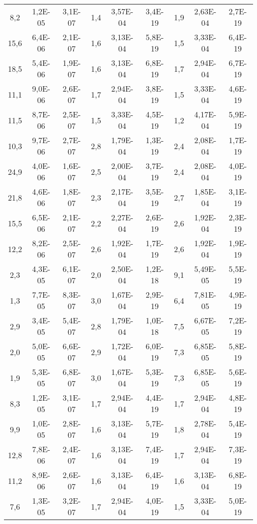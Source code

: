 \begin{longtable}{c c c c c c c c c}
8,2 & 1,2E-05 & 3,1E-07 & 1,4 & 3,57E-04 & 3,4E-19 & 1,9 & 2,63E-04 & 2,7E-19 \\ 
15,6 & 6,4E-06 & 2,1E-07 & 1,6 & 3,13E-04 & 5,8E-19 & 1,5 & 3,33E-04 & 6,4E-19 \\ 
18,5 & 5,4E-06 & 1,9E-07 & 1,6 & 3,13E-04 & 6,8E-19 & 1,7 & 2,94E-04 & 6,7E-19 \\ 
11,1 & 9,0E-06 & 2,6E-07 & 1,7 & 2,94E-04 & 3,8E-19 & 1,5 & 3,33E-04 & 4,6E-19 \\ 
11,5 & 8,7E-06 & 2,5E-07 & 1,5 & 3,33E-04 & 4,5E-19 & 1,2 & 4,17E-04 & 5,9E-19 \\ \midrule

10,3 & 9,7E-06 & 2,7E-07 & 2,8 & 1,79E-04 & 1,3E-19 & 2,4 & 2,08E-04 & 1,7E-19 \\ 
24,9 & 4,0E-06 & 1,6E-07 & 2,5 & 2,00E-04 & 3,7E-19 & 2,4 & 2,08E-04 & 4,0E-19 \\ 
21,8 & 4,6E-06 & 1,8E-07 & 2,3 & 2,17E-04 & 3,5E-19 & 2,7 & 1,85E-04 & 3,1E-19 \\ 
15,5 & 6,5E-06 & 2,1E-07 & 2,2 & 2,27E-04 & 2,6E-19 & 2,6 & 1,92E-04 & 2,3E-19 \\ 
12,2 & 8,2E-06 & 2,5E-07 & 2,6 & 1,92E-04 & 1,7E-19 & 2,6 & 1,92E-04 & 1,9E-19 \\  \hline

2,3 & 4,3E-05 & 6,1E-07 & 2,0 & 2,50E-04 & 1,2E-18 & 9,1 & 5,49E-05 & 5,5E-19 \\ 
1,3 & 7,7E-05 & 8,3E-07 & 3,0 & 1,67E-04 & 2,9E-19 & 6,4 & 7,81E-05 & 4,9E-19 \\ 
2,9 & 3,4E-05 & 5,4E-07 & 2,8 & 1,79E-04 & 1,0E-18 & 7,5 & 6,67E-05 & 7,2E-19 \\ 
2,0 & 5,0E-05 & 6,6E-07 & 2,9 & 1,72E-04 & 6,0E-19 & 7,3 & 6,85E-05 & 5,8E-19 \\ 
1,9 & 5,3E-05 & 6,8E-07 & 3,0 & 1,67E-04 & 5,3E-19 & 7,3 & 6,85E-05 & 5,6E-19 \\ \midrule

8,3 & 1,2E-05 & 3,1E-07 & 1,7 & 2,94E-04 & 4,4E-19 & 1,7 & 2,94E-04 & 4,8E-19 \\ 
9,9 & 1,0E-05 & 2,8E-07 & 1,6 & 3,13E-04 & 5,7E-19 & 1,8 & 2,78E-04 & 5,4E-19 \\ 
12,8 & 7,8E-06 & 2,4E-07 & 1,6 & 3,13E-04 & 7,4E-19 & 1,7 & 2,94E-04 & 7,3E-19 \\ 
11,2 & 8,9E-06 & 2,6E-07 & 1,6 & 3,13E-04 & 6,4E-19 & 1,6 & 3,13E-04 & 6,8E-19 \\ 
7,6 & 1,3E-05 & 3,2E-07 & 1,7 & 2,94E-04 & 4,0E-19 & 1,5 & 3,33E-04 & 5,0E-19 \\ \bottomrule


\end{longtable}